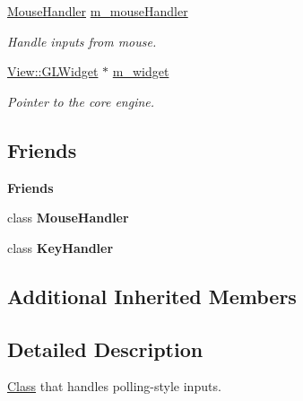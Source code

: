 \begin{Indent}
\begin{DoxyCompactItemize}
\mbox{\label{classrev_1_1_input_handler_a357a1640b6f9ef66fce524e63ae9e9e8}} 
\mbox{\hyperlink{classrev_1_1_mouse_handler}{Mouse\+Handler}} \mbox{\hyperlink{classrev_1_1_input_handler_a357a1640b6f9ef66fce524e63ae9e9e8}{m\+\_\+mouse\+Handler}}
\begin{DoxyCompactList}\small\item\em Handle inputs from mouse. \end{DoxyCompactList}\item 
\mbox{\label{classrev_1_1_input_handler_a69547adc6e73a327bbbfd5d21e03a485}} 
\mbox{\hyperlink{classrev_1_1_view_1_1_g_l_widget}{View\+::\+G\+L\+Widget}} $\ast$ \mbox{\hyperlink{classrev_1_1_input_handler_a69547adc6e73a327bbbfd5d21e03a485}{m\+\_\+widget}}
\begin{DoxyCompactList}\small\item\em Pointer to the core engine. \end{DoxyCompactList}\end{DoxyCompactItemize}
\end{Indent}
\subsection*{Friends}
\begin{Indent}\textbf{ Friends}\par
\begin{DoxyCompactItemize}
\item 
\mbox{\label{classrev_1_1_input_handler_a863e1587c956285777df79c7ae02f30f}} 
class {\bfseries Mouse\+Handler}
\item 
\mbox{\label{classrev_1_1_input_handler_a7ca490a21f71640112b19cba41fbb8db}} 
class {\bfseries Key\+Handler}
\end{DoxyCompactItemize}
\end{Indent}
\subsection*{Additional Inherited Members}


\subsection{Detailed Description}
\mbox{\hyperlink{struct_class}{Class}} that handles polling-\/style inputs. 

